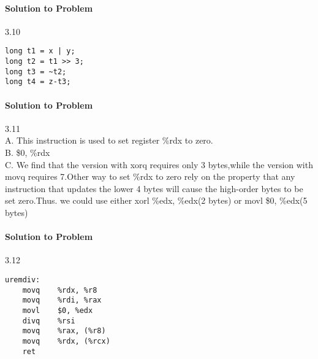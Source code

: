 \documentclass{report}
\begin{document}
\paragraph{Solution to Problem } 3.10 \\
\begin{lstlisting}
long t1 = x | y;
long t2 = t1 >> 3;
long t3 = ~t2;
long t4 = z-t3;
\end{lstlisting}

\paragraph{Solution to Problem } 3.11 \\
A. This instruction is used to set register \%rdx to zero. \\
B. \$0, \%rdx \\
C. We find that the version with xorq requires only 3 bytes,while the version with movq requires 7.Other way to set \%rdx to zero rely on the property that any instruction that updates the lower 4 bytes will cause the high-order bytes to be set zero.Thus. we could use either xorl \%edx, \%edx(2 bytes) or movl \$0, \%edx(5 bytes)


\paragraph{Solution to Problem } 3.12 \\
\begin{lstlisting}
uremdiv:
    movq    %rdx, %r8  
    movq    %rdi, %rax
    movl    $0, %edx
    divq    %rsi
    movq    %rax, (%r8)
    movq    %rdx, (%rcx)
    ret
    
\end{lstlisting}
\end{document}
